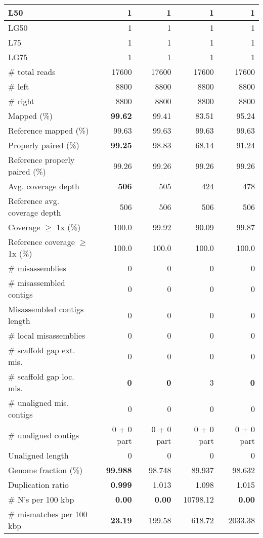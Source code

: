 \documentclass[12pt,a4paper]{article}
\begin{document}
\begin{table}[ht]
\begin{center}
\begin{tabular}{|l*{4}{|r}|}
L50 & 1 & 1 & 1 & 1 \\ \hline
LG50 & 1 & 1 & 1 & 1 \\ \hline
L75 & 1 & 1 & 1 & 1 \\ \hline
LG75 & 1 & 1 & 1 & 1 \\ \hline
\# total reads & 17600 & 17600 & 17600 & 17600 \\ \hline
\# left & 8800 & 8800 & 8800 & 8800 \\ \hline
\# right & 8800 & 8800 & 8800 & 8800 \\ \hline
Mapped (\%) & {\bf 99.62} & 99.41 & 83.51 & 95.24 \\ \hline
Reference mapped (\%) & 99.63 & 99.63 & 99.63 & 99.63 \\ \hline
Properly paired (\%) & {\bf 99.25} & 98.83 & 68.14 & 91.24 \\ \hline
Reference properly paired (\%) & 99.26 & 99.26 & 99.26 & 99.26 \\ \hline
Avg. coverage depth & {\bf 506} & 505 & 424 & 478 \\ \hline
Reference avg. coverage depth & 506 & 506 & 506 & 506 \\ \hline
Coverage $\geq$ 1x (\%) & 100.0 & 99.92 & 90.09 & 99.87 \\ \hline
Reference coverage $\geq$ 1x (\%) & 100.0 & 100.0 & 100.0 & 100.0 \\ \hline
\# misassemblies & 0 & 0 & 0 & 0 \\ \hline
\# misassembled contigs & 0 & 0 & 0 & 0 \\ \hline
Misassembled contigs length & 0 & 0 & 0 & 0 \\ \hline
\# local misassemblies & 0 & 0 & 0 & 0 \\ \hline
\# scaffold gap ext. mis. & 0 & 0 & 0 & 0 \\ \hline
\# scaffold gap loc. mis. & {\bf 0} & {\bf 0} & 3 & {\bf 0} \\ \hline
\# unaligned mis. contigs & 0 & 0 & 0 & 0 \\ \hline
\# unaligned contigs & 0 + 0 part & 0 + 0 part & 0 + 0 part & 0 + 0 part \\ \hline
Unaligned length & 0 & 0 & 0 & 0 \\ \hline
Genome fraction (\%) & {\bf 99.988} & 98.748 & 89.937 & 98.632 \\ \hline
Duplication ratio & {\bf 0.999} & 1.013 & 1.098 & 1.015 \\ \hline
\# N's per 100 kbp & {\bf 0.00} & {\bf 0.00} & 10798.12 & {\bf 0.00} \\ \hline
\# mismatches per 100 kbp & {\bf 23.19} & 199.58 & 618.72 & 2033.38 \\ \hline

\end{tabular}
\end{center}
\end{table}
\end{document}
